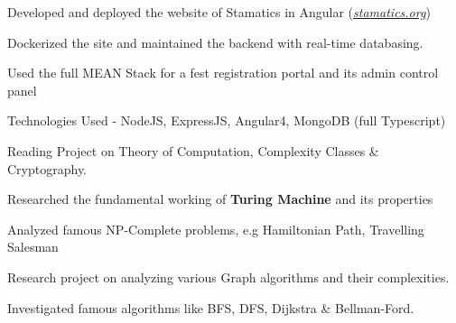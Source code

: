 \documentclass[]{deedy-resume-openfont}
\begin{document}
\begin{minipage}[t]{0.70\textwidth}
\begin{tightemize}
  \item Developed and deployed the website of Stamatics in Angular (\href{http://stamatics.org}{\textit{stamatics.org}})
  \item Dockerized the site and maintained the backend with real-time databasing.
\end{tightemize}
\begin{tightemize}
  \item Used the full MEAN Stack for a fest registration portal and its admin control panel
  \item Technologies Used - NodeJS, ExpressJS, Angular4, MongoDB (full Typescript)
\end{tightemize}

\begin{tightemize}
  \item Reading Project on Theory of Computation, Complexity Classes \& Cryptography.
  \item Researched the fundamental working of \textbf{Turing Machine} and its properties
  \item Analyzed famous NP-Complete problems, e.g Hamiltonian Path, Travelling Salesman  
\end{tightemize}

\begin{tightemize}
  \item Research project on analyzing various Graph algorithms and their complexities.
  \item Investigated famous algorithms like BFS, DFS, Dijkstra \& Bellman-Ford.
\end{tightemize}

\vspace{-0.3cm}

\end{minipage}
\end{document}
